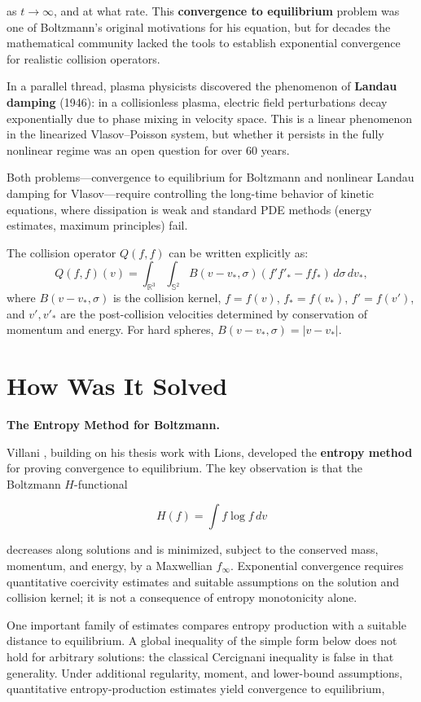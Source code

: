 as $t \to \infty$, and at what rate. This \textbf{convergence to equilibrium} problem was one of Boltzmann's original motivations for his equation, but for decades the mathematical community lacked the tools to establish exponential convergence for realistic collision operators.

In a parallel thread, plasma physicists discovered the phenomenon of \textbf{Landau damping} (1946): in a collisionless plasma, electric field perturbations decay exponentially due to phase mixing in velocity space. This is a linear phenomenon in the linearized Vlasov--Poisson system, but whether it persists in the fully nonlinear regime was an open question for over 60 years.

Both problems---convergence to equilibrium for Boltzmann and nonlinear Landau damping for Vlasov---require controlling the long-time behavior of kinetic equations, where dissipation is weak and standard PDE methods (energy estimates, maximum principles) fail.

The collision operator $Q(f,f)$ can be written explicitly as:
\[
Q(f,f)(v) = \int_{\mathbb{R}^3} \int_{\mathbb{S}^2} B(v-v_*, \sigma) \left( f' f'_* - f f_* \right) \, d\sigma \, dv_*,
\]
where $B(v-v_*, \sigma)$ is the collision kernel, $f = f(v)$, $f_* = f(v_*)$, $f' = f(v')$, and $v', v'_*$ are the post-collision velocities determined by conservation of momentum and energy. For hard spheres, $B(v-v_*, \sigma) = |v-v_*|$.

\section{How Was It Solved}\label{ch2010cedricvillani:how-was-it-solved}

\textbf{The Entropy Method for Boltzmann.}

Villani \cite{villani2008}, building on his thesis work with Lions, developed the \textbf{entropy method} for proving convergence to equilibrium. The key observation is that the Boltzmann $H$-functional

\[
H(f) = \int f \log f \, dv
\]

decreases along solutions and is minimized, subject to the conserved mass,
momentum, and energy, by a Maxwellian $f_\infty$. Exponential convergence
requires quantitative coercivity estimates and suitable assumptions on the
solution and collision kernel; it is not a consequence of entropy monotonicity
alone.

One important family of estimates compares entropy production with a suitable
distance to equilibrium. A global inequality of the simple form below does
not hold for arbitrary solutions: the classical Cercignani inequality is false
in that generality. Under additional regularity, moment, and lower-bound
assumptions, quantitative entropy-production estimates yield convergence to
equilibrium,

